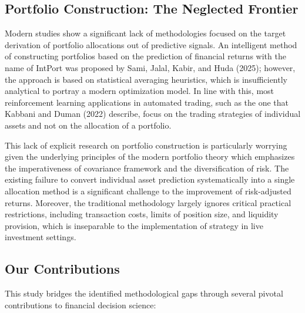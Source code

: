 \documentclass{singlecol-new}
\theoremstyle{TH}{
\newtheorem{lemma}{Lemma}
\newtheorem{theorem}[lemma]{Theorem}
\newtheorem{corrolary}[lemma]{Corrolary}
\newtheorem{conjecture}[lemma]{Conjecture}
\newtheorem{proposition}[lemma]{Proposition}
\newtheorem{claim}[lemma]{Claim}
\newtheorem{stheorem}[lemma]{Wrong Theorem}
\newtheorem{algorithm}{Algorithm}
}
\theoremstyle{THrm}{
\newtheorem{definition}{Definition}[section]
\newtheorem{question}{Question}[section]
\newtheorem{remark}{Remark}
\newtheorem{scheme}{Scheme}
}
\theoremstyle{THhit}{
\newtheorem{case}{Case}[section]
}
\begin{document}
\subsection{Portfolio Construction: The Neglected Frontier}
Modern studies show a significant lack of methodologies focused on the target derivation of portfolio allocations out of predictive signals. An intelligent method of constructing portfolios based on the prediction of financial returns with the name of IntPort was proposed by Sami, Jalal, Kabir, and Huda (2025); however, the approach is based on statistical averaging heuristics, which is insufficiently analytical to portray a modern optimization model. In line with this, most reinforcement learning applications in automated trading, such as the one that Kabbani and Duman (2022) describe, focus on the trading strategies of individual assets and not on the allocation of a portfolio.

This lack of explicit research on portfolio construction is particularly worrying given the underlying principles of the modern portfolio theory which emphasizes the imperativeness of covariance framework and the diversification of risk. The existing failure to convert individual asset prediction systematically into a single allocation method is a significant challenge to the improvement of risk-adjusted returns. Moreover, the traditional methodology largely ignores critical practical restrictions, including transaction costs, limits of position size, and liquidity provision, which is inseparable to the implementation of strategy in live investment settings.



\subsection{Our Contributions}
This study bridges the identified methodological gaps through several pivotal contributions to financial decision science:
\end{document}
